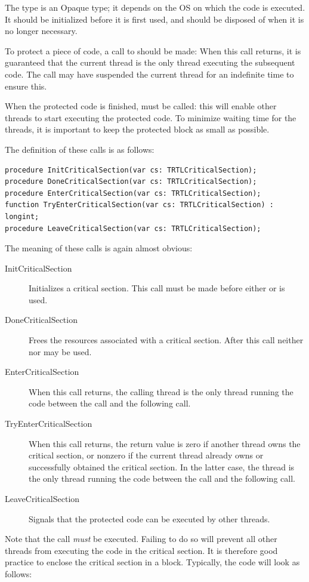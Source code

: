 The  type is an Opaque type; it depends on the 
OS on which the code is executed. It should be initialized before it 
is first used, and should be disposed of when it is no longer necessary.

To protect a piece of code, a call to  should 
be made: When this call returns, it is guaranteed that the current thread 
is the only thread executing the subsequent code. The call may have 
suspended the current thread for an indefinite time to ensure this. 

When the protected code is finished,  must 
be called: this will enable other threads to start executing the protected
code. To minimize waiting time for the threads, it is important to keep 
the protected block as small as possible.

The definition of these calls is as follows:
\begin{verbatim}
procedure InitCriticalSection(var cs: TRTLCriticalSection);
procedure DoneCriticalSection(var cs: TRTLCriticalSection);
procedure EnterCriticalSection(var cs: TRTLCriticalSection);
function TryEnterCriticalSection(var cs: TRTLCriticalSection) : longint;
procedure LeaveCriticalSection(var cs: TRTLCriticalSection);
\end{verbatim}
The meaning of these calls is again almost obvious:
\begin{description}
\item[InitCriticalSection] Initializes a critical section. 
This call must be made before either  
or  is used.
\item[DoneCriticalSection] Frees the resources associated with a
critical section. After this call neither  
nor  may be used.
\item[EnterCriticalSection] When this call returns, the calling 
thread is the only thread running the code between the  
call and the following  call.
\item[TryEnterCriticalSection] When this call returns, the return value is zero if another 
thread owns the critical section, or nonzero if the current thread already owns or successfully obtained the critical section. 
In the latter case, the thread is the only thread running the code between the  
call and the following  call.
\item[LeaveCriticalSection] Signals that the protected code can be executed 
by other threads.
\end{description}
Note that the  call {\em must} be executed. 
Failing to do so will prevent all other threads from executing the code 
in the critical section. It is therefore good practice to enclose the 
critical section in a  block. Typically, the code
will look as follows:

